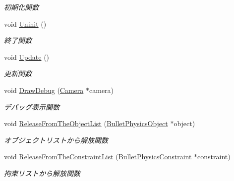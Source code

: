 \begin{DoxyCompactItemize}
\begin{DoxyCompactList}\small\item\em 初期化関数 \end{DoxyCompactList}\item 
void \mbox{\hyperlink{class_bullet_physics_manager_a2c7c91e5ceec246a87e61e156920022c}{Uninit}} ()
\begin{DoxyCompactList}\small\item\em 終了関数 \end{DoxyCompactList}\item 
void \mbox{\hyperlink{class_bullet_physics_manager_ae3798b00a0e8b169a07d05614cb7de58}{Update}} ()
\begin{DoxyCompactList}\small\item\em 更新関数 \end{DoxyCompactList}\item 
void \mbox{\hyperlink{class_bullet_physics_manager_aeebd0a40ebc6ce33aafc9cf1ad89fd19}{Draw\+Debug}} (\mbox{\hyperlink{class_camera}{Camera}} $\ast$camera)
\begin{DoxyCompactList}\small\item\em デバッグ表示関数 \end{DoxyCompactList}\item 
void \mbox{\hyperlink{class_bullet_physics_manager_a33ae1074dd25ea32dcc7e5c402231b11}{Release\+From\+The\+Object\+List}} (\mbox{\hyperlink{class_bullet_physics_object}{Bullet\+Physics\+Object}} $\ast$object)
\begin{DoxyCompactList}\small\item\em オブジェクトリストから解放関数 \end{DoxyCompactList}\item 
void \mbox{\hyperlink{class_bullet_physics_manager_a1984c226e0d77dfdf677070d659664de}{Release\+From\+The\+Constraint\+List}} (\mbox{\hyperlink{class_bullet_physics_constraint}{Bullet\+Physics\+Constraint}} $\ast$constraint)
\begin{DoxyCompactList}\small\item\em 拘束リストから解放関数 \end{DoxyCompactList}\end{DoxyCompactItemize}
